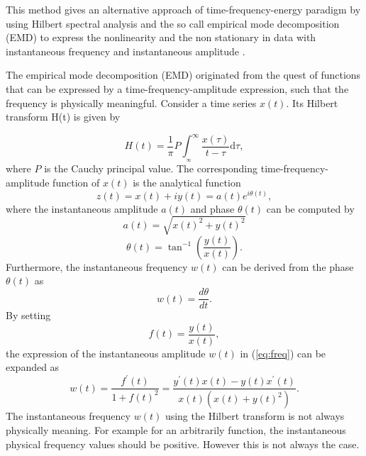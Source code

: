 \documentclass[11pt, oneside]{article}   	%
\begin{document}
\begin{flushleft}
This method gives an alternative approach of time-frequency-energy paradigm by using Hilbert spectral analysis and the so call empirical mode decomposition (EMD) to express the nonlinearity and the non stationary in data 
with instantaneous frequency and instantaneous amplitude \cite{norden2008}.
\end{flushleft}
\begin{flushleft}
The empirical mode decomposition (EMD) originated from the quest of functions that can be expressed by a time-frequency-amplitude expression, such that the frequency is physically meaningful.
Consider a time series $x(t)$. Its Hilbert transform H(t) is given by 

\begin{equation}
H(t) = \frac{1}{\pi}P\int_{_\infty}^{\infty}\frac{x(\tau)}{t-\tau}\mathrm{d}\tau,
\end{equation}
where $P$ is the Cauchy principal value. The corresponding time-frequency-amplitude function of $x(t)$ is the analytical function
\begin{equation}
z(t) = x(t) + iy(t) = a(t)e^{i\theta(t)},
\end{equation}
where the instantaneous amplitude $a(t)$ and phase $\theta(t)$ can be computed by 
\begin{equation}\label{eq:amp}
a(t) = \sqrt{x(t)^{2}+ y(t)^{2}}
\end{equation}
\begin{equation}
\theta(t) = \tan^{-1}\left(\frac{y(t)}{x(t)}\right).
\end{equation}
Furthermore, the instantaneous frequency $w(t)$ can be derived from the phase $\theta(t)$ as
\begin{equation}\label{eq:freq}
w(t) = \frac{d\theta}{dt}.
\end{equation}
By setting 
\begin{equation}
f(t) = \frac{y(t)}{x(t)}, \nonumber
\end{equation}
the expression of the instantaneous  amplitude $w(t)$ in (\ref{eq:freq}) can be expanded as
\begin{equation}
w(t) = \frac{f^{\prime}(t)}{1+f(t)^{2}} = \frac{y^{\prime}(t)x(t)-y(t)x^{\prime}(t)}{x(t)(x(t)+y(t)^{2})}.
\end{equation}
The instantaneous frequency $w(t)$ using the Hilbert transform is not always physically meaning. For example for an arbitrarily function, the instantaneous physical frequency values should be positive. However this is not always the case. 


\end{flushleft}
\end{document}
